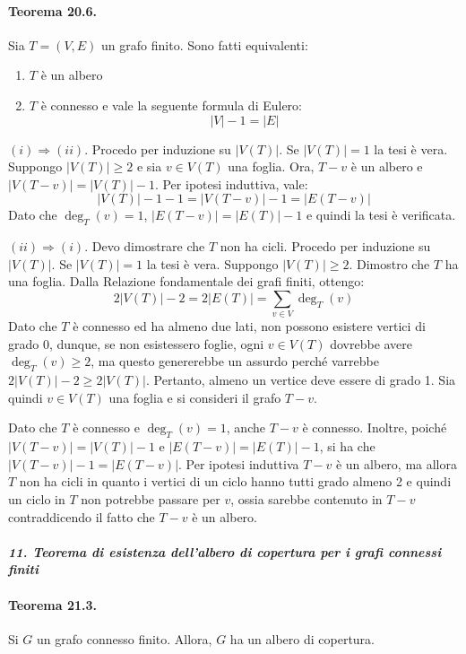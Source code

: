 \documentclass[12pt, a4paper]{report}
\theoremstyle{definition}
\begin{document}
\paragraph{Teorema 20.6.}
Sia $T=(V,E)$ un grafo finito. Sono fatti equivalenti:
\begin{enumerate}[label=(\roman*)]
    \item $T$ è un albero
    \item $T$ è connesso e vale la seguente formula di Eulero:
    \[|V|-1=|E|\]
\end{enumerate}
\begin{demonstration}
    $(i)\Rightarrow(ii)$. Procedo per induzione su $|V(T)|$. Se $|V(T)|=1$ la tesi
    è vera. Suppongo $|V(T)|\geq2$ e sia $v\in V(T)$ una foglia. Ora, $T-v$ è
    un albero e $|V(T-v)|=|V(T)|-1$. Per ipotesi induttiva, vale:
    \[|V(T)|-1-1=|V(T-v)|-1=|E(T-v)|\]
    Dato che $\deg_T(v)=1$, $|E(T-v)|=|E(T)|-1$ e quindi la tesi è verificata.

    $(ii)\Rightarrow(i)$. Devo dimostrare che $T$ non ha cicli. Procedo per
    induzione su $|V(T)|$. Se $|V(T)|=1$ la tesi è vera. Suppongo $|V(T)|\geq2$.
    Dimostro che $T$ ha una foglia. Dalla Relazione fondamentale dei grafi finiti,
    ottengo:
    \[2|V(T)|-2=2|E(T)|=\sum_{v\in V}\deg_T(v)\]
    Dato che $T$ è connesso ed ha almeno due lati, non possono esistere vertici
    di grado 0, dunque, se non esistessero foglie, ogni $v\in V(T)$ dovrebbe avere
    $\deg_T(v)\geq2$, ma questo genererebbe un assurdo perché varrebbe $2|V(T)|-
    2\geq2|V(T)|$. Pertanto, almeno un vertice deve essere di grado 1.
    Sia quindi $v\in V(T)$ una foglia e si consideri il grafo $T-v$.
    
    Dato che $T$ è connesso e $\deg_T(v)=1$, anche $T-v$ è connesso. Inoltre,
    poiché $|V(T-v)|=|V(T)|-1$ e $|E(T-v)|=|E(T)|-1$, si ha che $|V(T-v)|-1=
    |E(T-v)|$. Per ipotesi induttiva $T-v$ è un albero, ma allora $T$ non ha
    cicli in quanto i vertici di un ciclo hanno tutti grado almeno 2 e quindi
    un ciclo in $T$ non potrebbe passare per $v$, ossia sarebbe contenuto in
    $T-v$ contraddicendo il fatto che $T-v$ è un albero.
\end{demonstration}

\paragraph{\emph{11. Teorema di esistenza dell’albero di copertura per i grafi
connessi finiti}}
\paragraph{Teorema 21.3.}
Si $G$ un grafo connesso finito. Allora, $G$ ha un albero di copertura.
\end{document}
